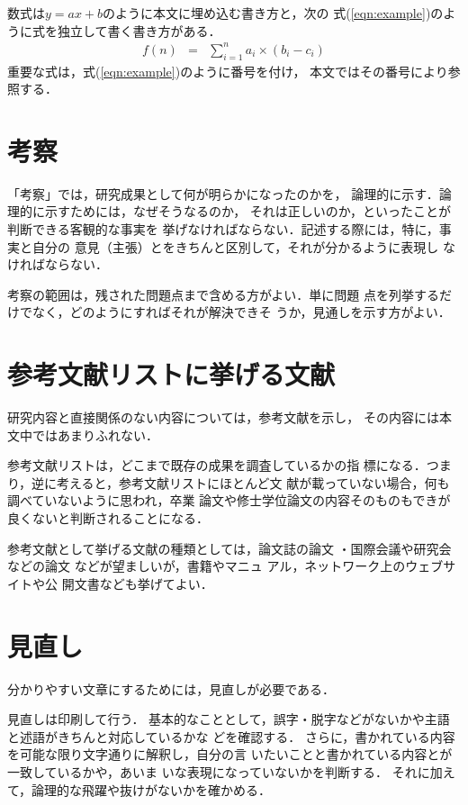 \documentclass[11pt,master]{oecu-thesis}
\begin{document}
数式は$ y = ax + b$のように本文に埋め込む書き方と，次の
式(\ref{eqn:example})のように式を独立して書く書き方がある．
\begin{eqnarray}
f(n) & = & \sum^{n}_{i = 1}a_i \times (b_i - c_i) \label{eqn:example}
\end{eqnarray}
重要な式は，式(\ref{eqn:example})のように番号を付け，
本文ではその番号により参照する．

\chapter{考察}\label{chap:discussion}

「考察」では，研究成果として何が明らかになったのかを，
論理的に示す．論理的に示すためには，なぜそうなるのか，
それは正しいのか，といったことが判断できる客観的な事実を
挙げなければならない．記述する際には，特に，事実と自分の
意見（主張）とをきちんと区別して，それが分かるように表現し
なければならない．

考察の範囲は，残された問題点まで含める方がよい．単に問題
点を列挙するだけでなく，どのようにすればそれが解決できそ
うか，見通しを示す方がよい．

\chapter{参考文献リストに挙げる文献}\label{chap:ref}

研究内容と直接関係のない内容については，参考文献を示し，
その内容には本文中ではあまりふれない．

参考文献リストは，どこまで既存の成果を調査しているかの指
標になる．つまり，逆に考えると，参考文献リストにほとんど文
献が載っていない場合，何も調べていないように思われ，卒業
論文や修士学位論文の内容そのものもできが良くないと判断されることになる．

参考文献として挙げる文献の種類としては，論文誌の論文
\cite{kern99:fmv_survey}・国際会議や研究会などの論文
\cite{nML1995}などが望ましいが，書籍\cite{sakubun}やマニュ
アル\cite{CWL-LRM-1.1}，ネットワーク上のウェブサイトや公
開文書\cite{systemc}なども挙げてよい．

\chapter{見直し}

分かりやすい文章にするためには，見直しが必要である．

見直しは印刷して行う．
基本的なこととして，誤字・脱字などがないかや主語と述語がきちんと対応しているかな
どを確認する．
さらに，書かれている内容を可能な限り文字通りに解釈し，自分の言
いたいことと書かれている内容とが一致しているかや，あいま
いな表現になっていないかを判断する．
それに加えて，論理的な飛躍や抜けがないかを確かめる．
\end{document}
